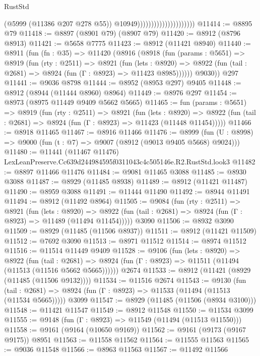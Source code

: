 \begin{lexlean}{RustStd}
\begin{coremodule}
                                              (@5999 (@11386 @207 @278 @55))
                                              @10949)))))))))))))))))))))
@11414 := @8895 @79
@11418 := @8897 (@8901 @79) (@8907 @79)
@11420 := @8912 (@8796 @8913)
@11421 := @5658 @7775
@11423 := @8912 (@11421 @8940)
@11440 := @8911
    (fun (fn : @35) =>
    @11420
      (@8916
        (@8918
          (fun (params : @5651) =>
          @8919
            (fun (rty : @2511) =>
            @8921
              (fun (lets : @8920) =>
              @8922 (fun (tail : @2681) => @8924 (fun (Γ : @8923) => @11423 @8985))))))
        @9030))
    @297
@11441 := @9036 @8798
@11444 := @8952 (@8953 @297) @9405
@11448 := @8912 (@8944 (@11444 @8960) @8964)
@11449 := @8976 @297
@11454 := @8973 (@8975 @11449 @9409 @5662 @5665)
@11465 := fun (params : @5651) =>
  @8919
    (fun (rty : @2511) =>
    @8921
      (fun (lets : @8920) =>
      @8922 (fun (tail : @2681) => @8924 (fun (Γ : @8923) => @11423 (@11448 @11454)))))
@11466 := @8918 @11465
@11467 := @8916 @11466
@11476 := @8999 (fun (U : @8998) => @9000 (fun (t : @7) => @9007 (@8912 (@9013 @9405 @5668) @9024)))
@11480 := @11441 (@11467 @11476) LexLeanPreserve.Cc639d244984595f0311043c4c505146e.R2.RustStd.look3
@11482 := @8897 @11466 @11476
@11484 := @9081 @11465 @3088
@11485 := @8930 @3088
@11487 := @8929 (@11485 @8938)
@11489 := @8912 (@11421 @11487)
@11490 := @8959 @3088
@11491 := @11444 @11490
@11492 := @8944 @11491
@11494 := @8912 (@11492 @8964)
@11505 := @9084
    (fun (rty : @2511) =>
    @8921
      (fun (lets : @8920) =>
      @8922 (fun (tail : @2681) => @8924 (fun (Γ : @8923) => @11489 (@11494 @11454)))))
    @3090
@11506 := @8932 @3090
@11509 := @8929 (@11485 (@11506 @8937))
@11511 := @8912 (@11421 @11509)
@11512 := @7692 @3090
@11513 := @8971 @11512
@11514 := @8974 @11512
@11516 := @11514 @11449 @9409
@11528 := @9106
    (fun (lets : @8920) =>
    @8922
      (fun (tail : @2681) =>
      @8924 (fun (Γ : @8923) => @11511 (@11494 (@11513 (@11516 @5662 @5665))))))
    @2674
@11533 := @8912 (@11421 (@8929 (@11485 (@11506 @9132))))
@11534 := @11516 @2674
@11543 := @9130
    (fun (tail : @2681) => @8924 (fun (Γ : @8923) => @11533 (@11494 (@11513 (@11534 @5665)))))
    @3099
@11547 := @8929 (@11485 (@11506 (@8934 @3100)))
@11548 := @11421 @11547
@11549 := @8912 @11548
@11550 := @11534 @3099
@11555 := @9148 (fun (Γ : @8923) => @11549 (@11494 (@11513 @11550)))
@11558 := @9161 (@9164 (@10650 @9169))
@11562 := @9161 (@9173 (@9167 @9175)) @8951
@11563 := @11558 @11562
@11564 := @11555 @11563
@11565 := @9036 @11548
@11566 := @8963 @11563
@11567 := @11492 @11566

\end{coremodule}
\end{lexlean}
